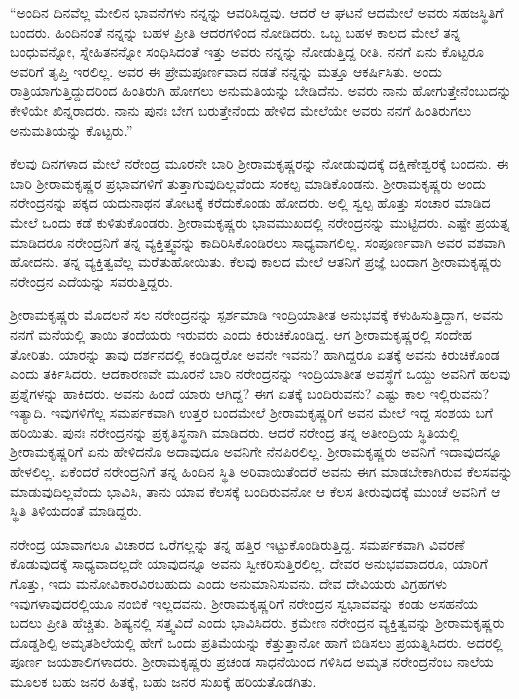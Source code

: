 “ಅಂದಿನ ದಿನವೆಲ್ಲ ಮೇಲಿನ ಭಾವನೆಗಳು ನನ್ನನ್ನು ಆವರಿಸಿದ್ದವು. ಆದರೆ ಆ ಘಟನೆ ಆದಮೇಲೆ ಅವರು ಸಹಜಸ್ಥಿತಿಗೆ ಬಂದರು. ಹಿಂದಿನಂತೆ ನನ್ನನ್ನು ಬಹಳ ಪ್ರೀತಿ ಆದರಗಳಿಂದ ನೋಡಿದರು. ಒಬ್ಬ ಬಹಳ ಕಾಲದ ಮೇಲೆ ತನ್ನ ಬಂಧುವನ್ನೋ, ಸ್ನೇಹಿತನನ್ನೋ ಸಂಧಿಸಿದಂತೆ ಇತ್ತು ಅವರು ನನ್ನನ್ನು ನೋಡುತ್ತಿದ್ದ ರೀತಿ. ನನಗೆ ಏನು ಕೊಟ್ಟರೂ ಅವರಿಗೆ ತೃಪ್ತಿ ಇರಲಿಲ್ಲ. ಅವರ ಈ ಪ್ರೇಮಪೂರ್ಣವಾದ ನಡತೆ ನನ್ನನ್ನು ಮತ್ತೂ ಆಕರ್ಷಿಸಿತು. ಅಂದು ರಾತ್ರಿಯಾಗುತ್ತಿದ್ದುದರಿಂದ ಹಿಂತಿರುಗಿ ಹೋಗಲು ಅನುಮತಿಯನ್ನು ಬೇಡಿದೆನು. ಅವರು ನಾನು ಹೋಗುತ್ತೇನೆಂಬುದನ್ನು ಕೇಳಿಯೇ ಖಿನ್ನರಾದರು. ನಾನು ಪುನಃ ಬೇಗ ಬರುತ್ತೇನೆಂದು ಹೇಳಿದ ಮೇಲೆಯೇ ಅವರು ನನಗೆ ಹಿಂತಿರುಗಲು ಅನುಮತಿಯನ್ನು ಕೊಟ್ಟರು.”

ಕೆಲವು ದಿನಗಳಾದ ಮೇಲೆ ನರೇಂದ್ರ ಮೂರನೇ ಬಾರಿ ಶ‍್ರೀರಾಮಕೃಷ್ಣರನ್ನು ನೋಡುವುದಕ್ಕೆ ದಕ್ಷಿಣೇಶ್ವರಕ್ಕೆ ಬಂದನು. ಈ ಬಾರಿ ಶ‍್ರೀರಾಮಕೃಷ್ಣರ ಪ್ರಭಾವಗಳಿಗೆ ತುತ್ತಾಗುವುದಿಲ್ಲವೆಂದು ಸಂಕಲ್ಪ ಮಾಡಿಕೊಂಡನು. ಶ‍್ರೀರಾಮಕೃಷ್ಣರು ಅಂದು ನರೇಂದ್ರನನ್ನು ಪಕ್ಕದ ಯದುನಾಥನ ತೋಟಕ್ಕೆ ಕರೆದುಕೊಂಡು ಹೋದರು. ಅಲ್ಲಿ ಸ್ವಲ್ಪ ಹೊತ್ತು ಸಂಚಾರ ಮಾಡಿದ ಮೇಲೆ ಒಂದು ಕಡೆ ಕುಳಿತುಕೊಂಡರು. ಶ‍್ರೀರಾಮಕೃಷ್ಣರು ಭಾವಮುಖದಲ್ಲಿ ನರೇಂದ್ರನನ್ನು ಮುಟ್ಟಿದರು. ಎಷ್ಟೇ ಪ್ರಯತ್ನ ಮಾಡಿದರೂ ನರೇಂದ್ರನಿಗೆ ತನ್ನ ವ್ಯಕ್ತಿತ್ತ್ವವನ್ನು ಕಾದಿರಿಸಿಕೊಂಡಿರಲು ಸಾಧ್ಯವಾಗಲಿಲ್ಲ. ಸಂಪೂರ್ಣವಾಗಿ ಅವರ ವಶವಾಗಿ ಹೋದನು. ತನ್ನ ವ್ಯಕ್ತಿತ್ವವೆಲ್ಲ ಮರೆತುಹೋಯಿತು. ಕೆಲವು ಕಾಲದ ಮೇಲೆ ಆತನಿಗೆ ಪ್ರಜ್ಞೆ ಬಂದಾಗ ಶ‍್ರೀರಾಮಕೃಷ್ಣರು ನರೇಂದ್ರನ ಎದೆಯನ್ನು ಸವರುತ್ತಿದ್ದರು.

ಶ‍್ರೀರಾಮಕೃಷ್ಣರು ಮೊದಲನೆ ಸಲ ನರೇಂದ್ರನನ್ನು ಸ್ಪರ್ಶಮಾಡಿ ಇಂದ್ರಿಯಾತೀತ ಅನುಭವಕ್ಕೆ ಕಳುಹಿಸುತ್ತಿದ್ದಾಗ, ಅವನು ನನಗೆ ಮನೆಯಲ್ಲಿ ತಾಯಿ ತಂದೆಯರು ಇರುವರು ಎಂದು ಕಿರುಚಿಕೊಂಡಿದ್ದ. ಆಗ ಶ‍್ರೀರಾಮಕೃಷ್ಣರಲ್ಲಿ ಸಂದೇಹ ತೋರಿತು. ಯಾರನ್ನು ತಾವು ದರ್ಶನದಲ್ಲಿ ಕಂಡಿದ್ದರೋ ಅವನೇ ಇವನು? ಹಾಗಿದ್ದರೂ ಏತಕ್ಕೆ ಅವನು ಕಿರುಚಿಕೊಂಡ ಎಂದು ತರ್ಕಿಸಿದರು. ಆದಕಾರಣವೇ ಮೂರನೆ ಬಾರಿ ನರೇಂದ್ರನನ್ನು ಇಂದ್ರಿಯಾತೀತ ಅವಸ್ಥೆಗೆ ಒಯ್ದು ಅವನಿಗೆ ಹಲವು ಪ್ರಶ್ನೆಗಳನ್ನು ಹಾಕಿದರು. ಅವನು ಹಿಂದೆ ಯಾರು ಆಗಿದ್ದ? ಈಗ ಏತಕ್ಕೆ ಬಂದಿರುವನು? ಎಷ್ಟು ಕಾಲ ಇಲ್ಲಿರುವನು? ಇತ್ಯಾದಿ. ಇವುಗಳಿಗೆಲ್ಲ ಸಮರ್ಪಕವಾಗಿ ಉತ್ತರ ಬಂದಮೇಲೆ ಶ‍್ರೀರಾಮಕೃಷ್ಣರಿಗೆ ಅವನ ಮೇಲೆ ಇದ್ದ ಸಂಶಯ ಬಗೆ ಹರಿಯಿತು. ಪುನಃ ನರೇಂದ್ರನನ್ನು ಪ್ರಕೃತಿಸ್ಥನಾಗಿ ಮಾಡಿದರು. ಆದರೆ ನರೇಂದ್ರ ತನ್ನ ಅತೀಂದ್ರಿಯ ಸ್ಥಿತಿಯಲ್ಲಿ ಶ‍್ರೀರಾಮಕೃಷ್ಣರಿಗೆ ಏನು ಹೇಳಿದನೊ ಅದಾವುದೂ ಅವನಿಗೇ ನೆನಪಿರಲಿಲ್ಲ. ಶ‍್ರೀರಾಮಕೃಷ್ಣರು ಅವನಿಗೆ ಇದಾವುದನ್ನೂ ಹೇಳಲಿಲ್ಲ. ಏಕೆಂದರೆ ನರೇಂದ್ರನಿಗೆ ತನ್ನ ಹಿಂದಿನ ಸ್ಥಿತಿ ಅರಿವಾಯಿತೆಂದರೆ ಅವನು ಈಗ ಮಾಡಬೇಕಾಗಿರುವ ಕೆಲಸವನ್ನು ಮಾಡುವುದಿಲ್ಲವೆಂದು ಭಾವಿಸಿ, ತಾನು ಯಾವ ಕೆಲಸಕ್ಕೆ ಬಂದಿರುವನೋ ಆ ಕೆಲಸ ತೀರುವುದಕ್ಕೆ ಮುಂಚೆ ಅವನಿಗೆ ಆ ಸ್ಥಿತಿ ತಿಳಿಯದಂತೆ ಮಾಡಿದ್ದರು.

ನರೇಂದ್ರ ಯಾವಾಗಲೂ ವಿಚಾರದ ಒರೆಗಲ್ಲನ್ನು ತನ್ನ ಹತ್ತಿರ ಇಟ್ಟುಕೊಂಡಿರುತ್ತಿದ್ದ. ಸಮರ್ಪಕವಾಗಿ ವಿವರಣೆ ಕೊಡುವುದಕ್ಕೆ ಸಾಧ್ಯವಾದಲ್ಲದೇ ಯಾವುದನ್ನೂ ಅವನು ಸ್ವೀಕರಿಸುತ್ತಿರಲಿಲ್ಲ. ದೇವರ ಅನುಭವವಾದರೂ, ಯಾರಿಗೆ ಗೊತ್ತು, ಇದು ಮನೋವಿಕಾರವಿರಬಹುದು ಎಂದು ಅನುಮಾನಿಸುವನು. ದೇವ ದೇವಿಯರು ವಿಗ್ರಹಗಳು ಇವುಗಳಾವುದರಲ್ಲಿಯೂ ನಂಬಿಕೆ ಇಲ್ಲದವನು. ಶ‍್ರೀರಾಮಕೃಷ್ಣರಿಗೆ ನರೇಂದ್ರನ ಸ್ವಭಾವವನ್ನು ಕಂಡು ಅಸಹನೆಯ ಬದಲು ಪ್ರೀತಿ ಹೆಚ್ಚಿತು. ಶಿಷ್ಯನಲ್ಲಿ ಸತ್ತ್ವವಿದೆ ಎಂದು ಭಾವಿಸಿದರು. ಕ್ರಮೇಣ ನರೇಂದ್ರನ ವ್ಯಕ್ತಿತ್ವವನ್ನು ಶ‍್ರೀರಾಮಕೃಷ್ಣರು ದೊಡ್ಡಶಿಲ್ಪಿ ಅಮೃತ\break ಶಿಲೆಯಲ್ಲಿ ಹೇಗೆ ಒಂದು ಪ್ರತಿಮೆಯನ್ನು ಕೆತ್ತುತ್ತಾನೋ ಹಾಗೆ ಬಿಡಿಸಲು ಪ್ರಯತ್ನಿಸಿದರು. ಅದರಲ್ಲಿ ಪೂರ್ಣ ಜಯಶಾಲಿಗಳಾದರು. ಶ‍್ರೀರಾಮಕೃಷ್ಣರು ಪ್ರಚಂಡ ಸಾಧನೆಯಿಂದ ಗಳಿಸಿದ ಅಮೃತ ನರೇಂದ್ರನೆಂಬ ನಾಲೆಯ ಮೂಲಕ ಬಹು ಜನರ ಹಿತಕ್ಕೆ, ಬಹು ಜನರ ಸುಖಕ್ಕೆ ಹರಿಯತೊಡಗಿತು.

